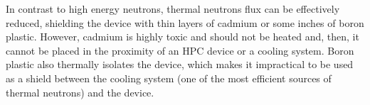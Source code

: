In contrast to high energy neutrons, thermal neutrons flux can be effectively reduced, shielding the device with thin layers of cadmium or some inches of boron plastic. However, cadmium is highly toxic and should not be heated and, then, it cannot be placed in the proximity of an HPC device or a cooling system. Boron plastic also thermally isolates the device, which makes it impractical to be used as a shield between the cooling system (one of the most efficient sources of thermal neutrons) and the device.


%
%
%
%
%
%
